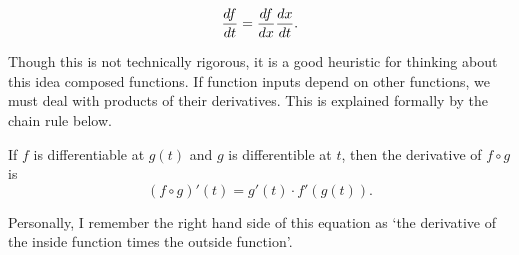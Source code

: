 \[
\frac{d f}{d t} = \frac{d f}{d x} \frac{d x}{d t}.
\]

Though this is not technically rigorous, it is a good heuristic for thinking about this idea composed functions. If function inputs depend on other functions, we must deal with products of their derivatives. This is explained formally by the chain rule below.

\begin{prop}
If $f$ is differentiable at $g(t)$ and $g$ is differentible at $t$, then the derivative of $f\circ g$ is
\[
(f\circ g)'(t) = g'(t)\cdot f'(g(t)).
\]
\end{prop}
\begin{rem}
Personally, I remember the right hand side of this equation as `the derivative of the inside function times the outside function'.
\end{rem}




